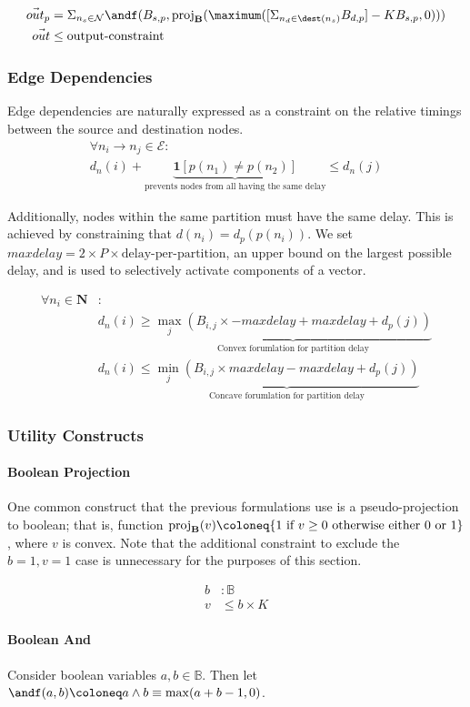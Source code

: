 \begin{align*}
\vec{out}_p &= \Sigma_{n_s \in \mathcal{N}} \andf(B_{s, p}, \projb{\maximum([\Sigma_{n_d \in \dest(n_s)} B_{d, p}] - KB_{s, p}, 0)}) \\
\vec{out}&\le \textrm{output-constraint}
\end{align*}

\subsubsection{Edge Dependencies}
Edge dependencies are naturally expressed as a constraint on the relative timings between the source and destination nodes.
\begin{align*}
	\forall n_i \to n_j \in \mathcal{E}:\\
	d_n(i) + \underbrace{\mathbf{1}[p(n_1) \ne p(n_2)]}_{\text{prevents nodes from all having the same delay}} \le d_n(j)
\end{align*}

Additionally, nodes within the same partition must have the same delay. This is achieved by constraining that $d(n_i) = d_p(p(n_i))$. We set $maxdelay = 2 \times P \times \text{delay-per-partition}$, an upper bound on the largest possible delay, and is used to selectively activate components of a vector.

\begin{align*}
\forall n_i \in \mathbf{N}&:\\
&d_n(i) \ge \underbrace{\max_j(B_{i, j} \times - maxdelay + maxdelay + d_p(j))}_{\text{Convex forumlation for partition delay}}\\
&d_n(i) \le \underbrace{\min_j(B_{i, j} \times maxdelay - maxdelay + d_p(j))}_{\text{Concave forumlation for partition delay}}
\end{align*}

\subsubsection{Utility Constructs}
\paragraph{Boolean Projection}
\label{sec:bool_proj}
One common construct that the previous formulations use is a pseudo-projection to boolean; that is, function $\projb{v} \coloneq \{ 1\ \text{if}\ v \ge 0 \ \text{otherwise either 0 or 1}\}$, where $v$ is convex. Note that the additional constraint to exclude the $b = 1, v = 1$ case is unnecessary for the purposes of this section.

\begin{align*}
	b&: \mathbb{B}\\
	v&\le b \times K
\end{align*}

\paragraph{Boolean And}
Consider boolean variables $a, b \in \mathbb{B}$. Then let $\andf(a, b) \coloneq a \land b \equiv \max(a + b - 1, 0)$.